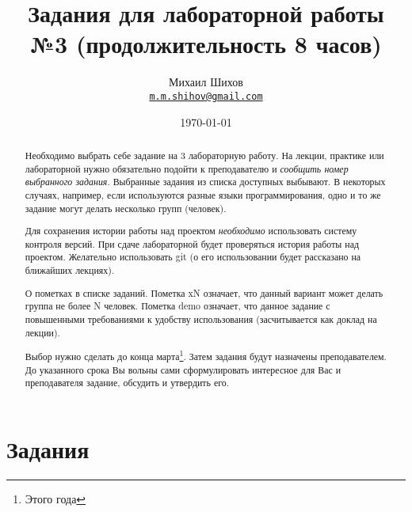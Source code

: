 \documentclass[a4paper]{article}
\title{Задания для лабораторной работы №3 (продолжительность 8 часов)}
\date{\today}
\author{Михаил Шихов \\ \texttt{\underline{m.m.shihov@gmail.com}}}
\begin{document}
\maketitle

\begin{abstract}
    Необходимо выбрать себе задание на 3 лабораторную работу. На лекции, практике или лабораторной нужно обязательно подойти к преподавателю и \emph{сообщить номер выбранного задания}. Выбранные задания из списка доступных выбывают. В некоторых случаях, например, если используются разные языки программирования, одно и то же задание могут делать несколько групп (человек).
    
    Для сохранения истории работы над проектом \emph{необходимо} использовать систему контроля версий. При сдаче лабораторной будет проверяться история работы над проектом. Желательно использовать git (о его использовании будет рассказано на ближайших лекциях).
    
    О пометках в списке заданий. Пометка xN означает, что данный вариант может делать группа не более N человек. Пометка demo означает, что данное задание с повышенными требованиями к удобству использования (засчитывается как доклад на лекции).
    
    Выбор нужно сделать до конца марта\footnote{Этого года}. Затем задания будут назначены преподавателем. До указанного срока Вы вольны сами сформулировать интересное для Вас и преподавателя задание, обсудить и утвердить его. 
\end{abstract}

\section{Задания}
\end{document}
